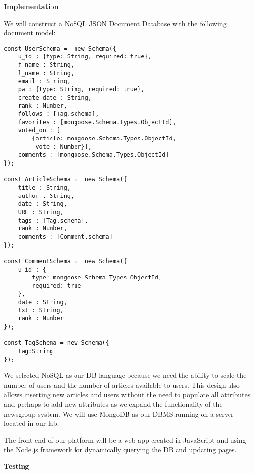 \documentclass{report}
\begin{document}
\textbf{Implementation}

We will construct a NoSQL JSON Document Database with the following
document model:

\newpage
\begin{lstlisting}
const UserSchema =  new Schema({
    u_id : {type: String, required: true},
    f_name : String,
    l_name : String,
    email : String,
    pw : {type: String, required: true},
    create_date : String,
    rank : Number,
    follows : [Tag.schema],
    favorites : [mongoose.Schema.Types.ObjectId],
    voted_on : [
        {article: mongoose.Schema.Types.ObjectId,
         vote : Number}],
    comments : [mongoose.Schema.Types.ObjectId]
});

const ArticleSchema =  new Schema({
    title : String,
    author : String,
    date : String,
    URL : String,
    tags : [Tag.schema],
    rank : Number,
    comments : [Comment.schema]
});

const CommentSchema =  new Schema({
    u_id : {
        type: mongoose.Schema.Types.ObjectId, 
        required: true
    },
    date : String, 
    txt : String,
    rank : Number
});

const TagSchema = new Schema({
    tag:String
});
\end{lstlisting}
\newpage

We selected NoSQL as our DB language because we need the ability to
scale the number of users and the number of articles available to users.
This design also allows inserting new articles and users without the
need to populate all attributes and perhaps to add new attributes as we
expand the functionality of the newsgroup system. We will use MongoDB as
our DBMS running on a server located in our lab.

The front end of our platform will be a web-app created in JavaScript
and using the Node.js framework for dynamically querying the DB and
updating pages.

\textbf{Testing}
\end{document}
